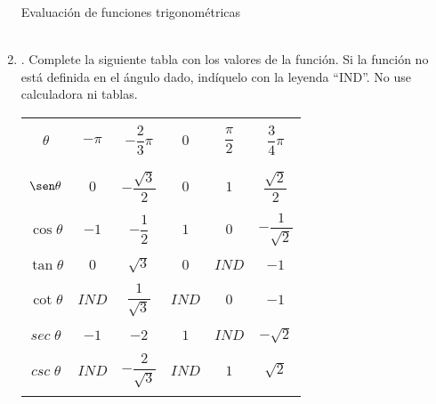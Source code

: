 \begin{enumerate}
Evaluación de funciones trigonométricas\\\\

\item . Complete la siguiente tabla con los valores de la función. Si la función no está definida en el ángulo dado, indíquelo con la leyenda “IND”. No use calculadora ni tablas.
    \begin{center}
	\begin{tabular}{cccccc}
	    \hline\\
	    $\theta$&$-\pi$&$-\dfrac{2}{3}\pi$&$0$&$\dfrac{\pi}{2}$&$\dfrac{3}{4}\pi$\\\\
	    \hline\\
	    $\sen \theta$&$0$&$-\dfrac{\sqrt{3}}{2}$&$0$&$1$&$\dfrac{\sqrt{2}}{2}$\\\\
	    $\cos \theta$&$-1$&$-\dfrac{1}{2}$&$1$&$0$&$-\dfrac{1}{\sqrt{2}}$\\\\
	    $\tan \theta$&$0$&$\sqrt{3}$&$0$&$IND$&$-1$\\\\
	    $\cot \theta$&$IND$&$\dfrac{1}{\sqrt{3}}$&$IND$&$0$&$-1$\\\\
	    $sec\; \theta$&$-1$&$-2$&$1$&$IND$&$-\sqrt{2}$\\\\
	    $csc\; \theta$&$IND$&$-\dfrac{2}{\sqrt{3}}$&$IND$&$1$&$\sqrt{2}$\\\\
	    \hline
	\end{tabular}
    \end{center}


\end{enumerate}
